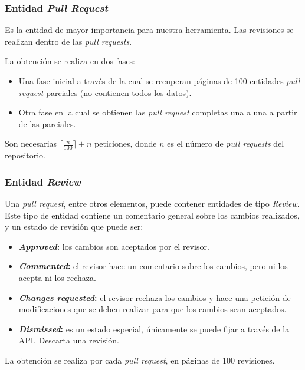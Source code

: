 \subsubsection{Entidad \emph{Pull Request}}

Es la entidad de mayor importancia para nuestra herramienta. Las revisiones se realizan dentro de las \emph{pull requests}.

La obtención se realiza en dos fases:

\begin{itemize}
\item Una fase inicial a través de la cual se recuperan páginas de 100 entidades \emph{pull request} parciales (no contienen todos los datos).
\item Otra fase en la cual se obtienen las \emph{pull request} completas una a una a partir de las parciales.
\end{itemize}


Son necesarias $\lceil\frac{n}{100}\rceil + n$ peticiones, donde $n$ es el número de \emph{pull requests} del repositorio.

\subsubsection{Entidad \emph{Review}}

Una \emph{pull request}, entre otros elementos, puede contener entidades de tipo \emph{Review}. Este tipo de entidad contiene un comentario general sobre los cambios realizados, y un estado de revisión que puede ser:

\begin{itemize}
\tightlist
	\item \textbf{\emph{Approved}:} los cambios son aceptados por el revisor.
	\item \textbf{\emph{Commented}:} el revisor hace un comentario sobre los cambios, pero ni los acepta ni los rechaza.
	\item \textbf{\emph{Changes requested}:} el revisor rechaza los cambios y hace una petición de modificaciones que se deben realizar para que los cambios sean aceptados.
	\item \textbf{\emph{Dismissed}:} es un estado especial, únicamente se puede fijar a través de la API. Descarta una revisión.
\end{itemize}

La obtención se realiza por cada \emph{pull request}, en páginas de 100 revisiones.

